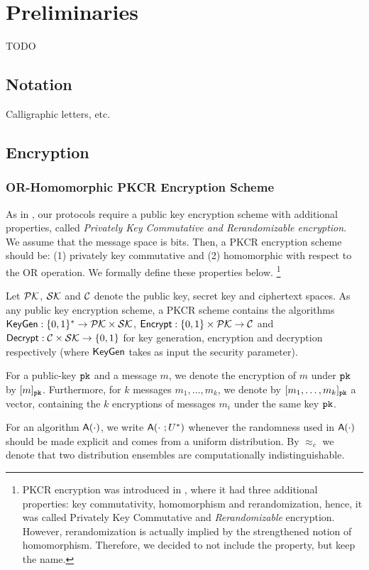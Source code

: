 \chapter{Preliminaries}
TODO

\section{Notation}
Calligraphic letters, etc.

\section{Encryption}
\subsection{OR-Homomorphic PKCR Encryption Scheme}\label{sec:PKCR}
As in \cite{C:AkaLaVMor17}, our protocols require a public key encryption scheme with additional properties, called \emph{Privately Key Commutative and Rerandomizable encryption}.
We assume that the message space is bits. Then, a PKCR encryption scheme should be: (1) privately key commutative and (2) homomorphic with respect to the OR operation. We formally define these properties below.
\footnote{PKCR encryption was introduced in \cite{EC:AkaMor17,C:AkaLaVMor17}, where it had three additional properties: key commutativity, homomorphism and rerandomization, hence, it was called Privately Key Commutative and \emph{Rerandomizable} encryption. However, rerandomization is actually implied by the strengthened notion of homomorphism. Therefore, we decided to not include the property, but keep the name.}

Let $\mathcal{PK}$, $\mathcal{SK}$ and $\mathcal{C}$ denote the public key, secret key and ciphertext spaces. As any public key encryption scheme, a PKCR scheme contains the algorithms $\textsf{KeyGen}:\{0,1\}^* \to \mathcal{PK} \times \mathcal{SK}$, $\textsf{Encrypt}:\{0,1\} \times \mathcal{PK} \to \mathcal{C}$ and $\textsf{Decrypt}:\mathcal{C} \times \mathcal{SK} \to \{0,1\}$ for key generation, encryption and decryption respectively (where $\textsf{KeyGen}$ takes as input the security parameter).

For a public-key $\texttt{pk}$ and a message $m$, we denote the encryption of $m$ under $\texttt{pk}$ by $[m]_{\texttt{pk}}$. Furthermore, for $k$ messages $m_1,\dots,m_k$, we denote by $[m_1,\dots,m_k]_{\texttt{pk}}$ a vector, containing the $k$ encryptions of messages $m_i$ under the same key $\texttt{pk}$.

For an algorithm $\textsf{A}(\cdot)$, we write $\textsf{A}(\cdot \ ;U^*)$ whenever the randomness used in $\textsf{A}(\cdot)$ should be made explicit and comes from a uniform distribution. By $\approx_c$ we denote that two distribution ensembles are computationally indistinguishable.

